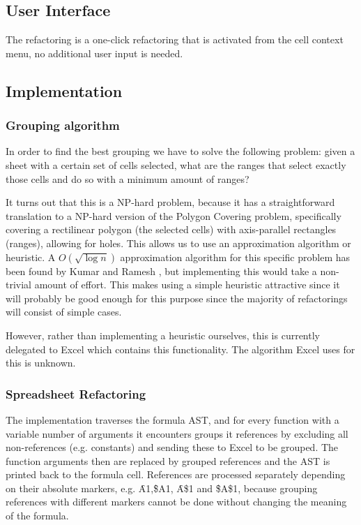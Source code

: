 \subsection{User Interface}

The refactoring is a one-click refactoring that is activated from the cell context menu, no additional user input is needed.

\subsection{Implementation}

\subsubsection{Grouping algorithm}

In order to find the best grouping we have to solve the following problem: given a sheet with a certain set of cells selected, what are the ranges that select exactly those cells and do so with a minimum amount of ranges?

It turns out that this is a NP-hard problem, because it has a straightforward translation to a NP-hard version of the Polygon Covering problem, specifically covering a rectilinear polygon (the selected cells) with axis-parallel rectangles (ranges), allowing for holes.
This allows us to use an approximation algorithm or heuristic.
A $O(\sqrt{\log{n}})$ approximation algorithm for this specific problem has been found by Kumar and Ramesh \cite{kumar2003covering}, but implementing this would take a non-trivial amount of effort.
This makes using a simple heuristic attractive since it will probably be good enough for this purpose since the majority of refactorings will consist of simple cases.

However, rather than implementing a heuristic ourselves, this is currently delegated to Excel which contains this functionality.
The algorithm Excel uses for this is unknown.

\subsubsection{Spreadsheet Refactoring}

The implementation traverses the formula AST, and for every function with a variable number of arguments it encounters groups it references by excluding all non-references (e.g. constants) and sending these to Excel to be grouped.
The function arguments then are replaced by grouped references and the AST is printed back to the formula cell.
References are processed separately depending on their absolute markers, e.g. \f{A1},\f{\$A1}, \f{A\$1} and \f{\$A\$1}, because grouping references with different markers cannot be done without changing the meaning of the formula.


